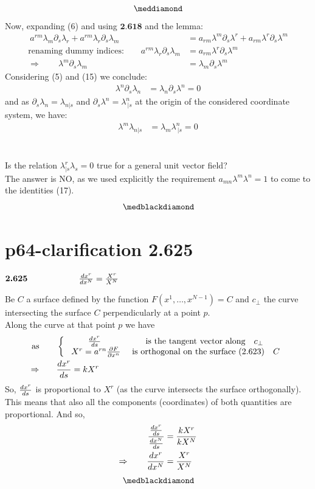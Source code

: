$$\meddiamond$$
Now, expanding (6) and using $\textbf{2.618}$ and the lemma:
\begin{align}
\ a^{rm}\lambda_m\partial_s \lambda_r+ a^{rm} \lambda_r \partial_s \lambda_m &= a_{rm} \lambda^m \partial_s \lambda^r + a_{rm} \lambda^r \partial_s \lambda^m\\
\text{renaming dummy indices:}\quad\quad   a^{rm} \lambda_r \partial_s \lambda_m &= a_{rm} \lambda^r \partial_s \lambda^m \\
\Rightarrow\quad\quad \lambda^m \partial_s \lambda_m &= \lambda_m \partial_s \lambda^m
\end{align}
Considering (5) and (15) we conclude:
\begin{align}
\lambda^n \partial_s \lambda_n &= \lambda_n \partial_s \lambda^n = 0
\end{align}
and as $\partial_s \lambda_n = \lambda_{n|s} $ and $\partial_s \lambda^n = \lambda^n_{\ |s} $ at the origin of the considered coordinate system, we have:
\begin{align}
\lambda^m \lambda_{n|s} &= \lambda_m \lambda^n_{\ |s} = 0
\end{align}\\\\

Is the relation $\lambda^r_{|s}\lambda_s = 0$ true for a general unit vector field?\\
The answer is NO, as we used explicitly the requirement $a_{mn}\lambda^m\lambda^n = 1 $ to come to the identities (17).
$$\medblackdiamond$$
\newpage

\section{p64-clarification 2.625}
\begin{tcolorbox}
$\textbf{2.625} \quad\quad\quad\quad\quad\quad \dv{ x^r}{x^N} = \frac{X^r}{X^N}$
\end{tcolorbox}
Be $C$ a surface defined by the function $F(x^1,\dots, x^{N-1}) = C$ and  $c_{\perp}$ the curve intersecting the surface $C$ perpendicularly at a point $p$.\\
Along the curve at that point $p$ we have
\begin{align}
\text{as}\quad\quad & \left \{ \begin{array}{cc}
\dv{ x^r}{s}& \text{is the tangent vector along}\quad c_{\perp}\\
\ X^r = a^{rn}\pdv{F}{x^n}& \text{ is orthogonal on the surface (2.623)}\quad C\\
\end{array}\right.\\
\Rightarrow \quad\quad & \dv{ x^r}{s} = kX^r
\end{align}
So, $\dv{ x^r}{s}$ is proportional to $X^r$ (as the curve intersects the surface orthogonally). This means that also all the components (coordinates) of both quantities are proportional. And so,
\begin{align}
\frac{\dv{ x^r}{s}}{\dv{ x^N}{s}} &= \frac{kX^r}{kX^N}\\
\Rightarrow\quad\quad \dv{ x^r}{x^N} &= \frac{X^r}{X^N}
\end{align}
$$\medblackdiamond$$
\newpage

